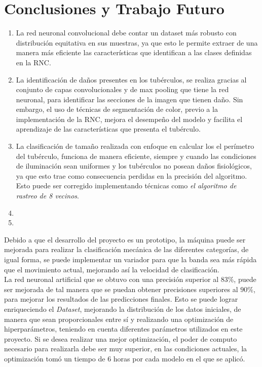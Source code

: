 \chapter{Conclusiones y Trabajo Futuro}

\begin{enumerate}
	\item La red neuronal convolucional debe contar un dataset más robusto con distribución equitativa en sus muestras, ya que esto le permite extraer de una manera más eficiente las características que identifican a las clases definidas en la RNC.
	
	\item La identificación de daños presentes en los tubérculos, se realiza gracias al conjunto de capas convolucionales y de max pooling que tiene la red neuronal, para identificar las secciones de la imagen que tienen daño. Sin embargo, el uso de técnicas de segmentación de color, previo a la implementación de la RNC, mejora el desempeño del modelo y facilita el aprendizaje de las características que presenta el tubérculo.
	
	\item La clasificación de tamaño realizada con enfoque en calcular los el perímetro del tubérculo, funciona de manera eficiente, siempre y cuando las condiciones de iluminación sean uniformes y los tubérculos no posean daños fisiológicos, ya que esto trae como consecuencia perdidas en la precisión del algoritmo. Esto puede ser corregido implementando técnicas como \textit{el algoritmo de rastreo de 8 vecinos}.
	\item
	\item
\end{enumerate}


Debido a que el desarrollo del proyecto es un prototipo, la máquina puede ser mejorada para realizar la clasificación mecánica de las diferentes categorías, de igual forma, se puede implementar un variador para que la banda sea más rápida que el movimiento actual, mejorando así la velocidad de clasificación.\\

La red neuronal artificial que se obtuvo con una precisión superior al $83\%$, puede ser mejorada de tal manera que se puedan obtener precisiones superiores al $90\%$, para mejorar los resultados de las predicciones finales. Esto se puede lograr enriqueciendo el \textit{Dataset}, mejorando la distribución de los datos iniciales, de manera que sean proporcionales entre sí y realizando una optimización de hiperparámetros, teniendo en cuenta diferentes parámetros utilizados en este proyecto. Si se desea realizar una mejor optimización, el poder de computo necesario para realizarla debe ser muy superior, en las condiciones actuales, la optimización tomó un tiempo de $6$ horas por cada modelo en el que se aplicó.\\

